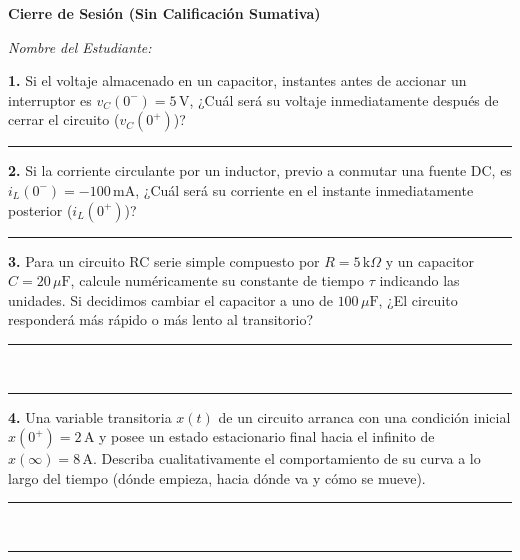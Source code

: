 \documentclass[11pt, a4paper]{article}
\begin{document}
\begin{tcolorbox}[colback=ucbblue!5!white, colframe=ucbblue, title=\textbf{Exit Ticket Formativo: Introducción a Circuitos Dinámicos (EC3)}]
    \centering \textbf{Cierre de Sesión (Sin Calificación Sumativa)}
\end{tcolorbox}

\noindent\textit{Nombre del Estudiante:} \hrulefill

\vspace{0.4cm}
\textbf{1.} Si el voltaje almacenado en un capacitor, instantes antes de accionar un interruptor es $v_C(0^-) = 5\,\text{V}$, ¿Cuál será su voltaje inmediatamente después de cerrar el circuito ($v_C(0^+)$)? \\
\rule{\textwidth}{0.4pt}

\vspace{0.6cm}
\textbf{2.} Si la corriente circulante por un inductor, previo a conmutar una fuente DC, es $i_L(0^-) = -100\,\text{mA}$, ¿Cuál será su corriente en el instante inmediatamente posterior ($i_L(0^+)$)? \\
\rule{\textwidth}{0.4pt}

\vspace{0.6cm}
\textbf{3.} Para un circuito RC serie simple compuesto por $R = 5\,\text{k}\Omega$ y un capacitor $C = 20\,\mu\text{F}$, calcule numéricamente su constante de tiempo $\tau$ indicando las unidades. Si decidimos cambiar el capacitor a uno de $100\,\mu\text{F}$, ¿El circuito responderá más rápido o más lento al transitorio? \\
\rule{\textwidth}{0.4pt} \\
\rule{\textwidth}{0.4pt}

\vspace{0.6cm}
\textbf{4.} Una variable transitoria $x(t)$ de un circuito arranca con una condición inicial $x(0^+) = 2\,\text{A}$ y posee un estado estacionario final hacia el infinito de $x(\infty) = 8\,\text{A}$. Describa cualitativamente el comportamiento de su curva a lo largo del tiempo (dónde empieza, hacia dónde va y cómo se mueve). \\
\rule{\textwidth}{0.4pt} \\
\rule{\textwidth}{0.4pt}
\end{document}
